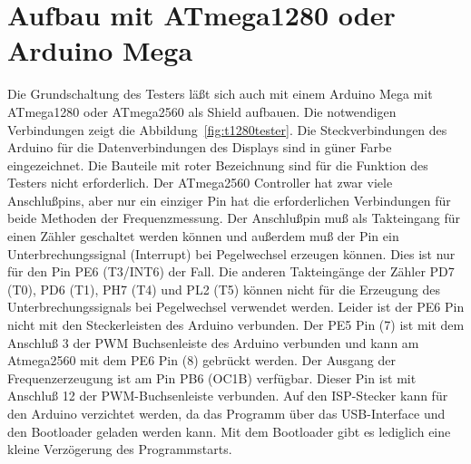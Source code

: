 \section{Aufbau mit ATmega1280 oder Arduino Mega}
Die Grundschaltung des Testers läßt sich auch mit einem Arduino Mega mit ATmega1280 oder
ATmega2560 als Shield aufbauen.
Die notwendigen Verbindungen zeigt die Abbildung~\ref{fig:t1280tester}.
Die Steckverbindungen des Arduino für die Datenverbindungen des Displays sind in güner Farbe eingezeichnet.
Die Bauteile mit roter Bezeichnung sind für die Funktion des Testers nicht erforderlich.
Der ATmega2560 Controller hat zwar viele Anschlußpins, aber nur ein einziger Pin hat die
erforderlichen Verbindungen für beide Methoden der Frequenzmessung. 
Der Anschlußpin muß als Takteingang für einen Zähler geschaltet werden können und außerdem muß
der Pin ein Unterbrechungssignal (Interrupt) bei Pegelwechsel erzeugen können.
Dies ist nur für den Pin PE6 (T3/INT6) der Fall. Die anderen Takteingänge der Zähler
PD7 (T0), PD6 (T1), PH7 (T4) und PL2 (T5) können nicht für die Erzeugung des Unterbrechungssignals
bei Pegelwechsel verwendet werden.
Leider ist der PE6 Pin nicht mit den Steckerleisten des Arduino verbunden.
Der PE5 Pin (7) ist mit dem Anschluß 3 der PWM Buchsenleiste des Arduino verbunden und kann
am Atmega2560 mit dem PE6 Pin (8) gebrückt werden.
Der Ausgang der Frequenzerzeugung ist am Pin PB6 (OC1B) verfügbar. Dieser Pin ist mit Anschluß 12
der PWM-Buchsenleiste verbunden.
Auf den ISP-Stecker kann für den Arduino verzichtet werden, da das Programm über
das USB-Interface und den Bootloader geladen werden kann.  Mit dem
Bootloader gibt es lediglich eine kleine Verzögerung des Programmstarts.

